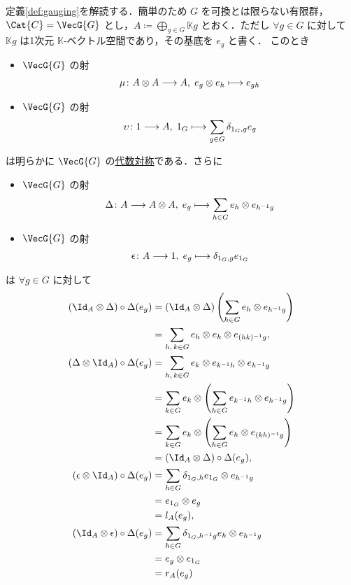 \documentclass[TQFT_main]{subfiles}
\begin{document}
定義\ref{def:gauging}を解読する．簡単のため $G$ を可換とは限らない有限群，$\Cat{C} = \VecG{G}$ とし，$A \coloneqq \bigoplus_{g \in G} \mathbb{K} g$ とおく．ただし $\forall g \in G$ に対して $\mathbb{K} g$ は1次元 $\mathbb{K}$-ベクトル空間であり，その基底を $e_g$ と書く．
このとき
\begin{itemize}
    \item $\VecG{G}$ の射
    \begin{align}
        \mu \colon A \otimes A \longrightarrow A,\; e_g \otimes e_h \longmapsto e_{gh}
    \end{align}
    \item $\VecG{G}$ の射
    \begin{align}
        \upsilon \colon 1 \longrightarrow A,\; 1_G \longmapsto \sum_{g \in G} \delta_{1_G,g} e_g
    \end{align}
\end{itemize}
は明らかに $\VecG{G}$ の\hyperref[def:algobj]{代数対称}である．さらに
\begin{itemize}
    \item $\VecG{G}$ の射
    \begin{align}
        \Delta \colon A \longrightarrow A \otimes A,\; e_g \longmapsto \sum_{h \in G} e_h \otimes e_{h^{-1}g}
    \end{align}
    \item $\VecG{G}$ の射
    \begin{align}
        \epsilon \colon A \longrightarrow 1,\; e_g \longmapsto \delta_{1_G,g} e_{1_G}
    \end{align}
\end{itemize}
は $\forall g \in G$ に対して
\begin{align}
    (\Id_A \otimes \Delta) \circ \Delta (e_g) 
    &= (\Id_A \otimes \Delta) \left(\sum_{h \in G} e_h \otimes e_{h^{-1}g}\right) \\
    &= \sum_{h,\, k \in G} e_h \otimes e_{k} \otimes e_{(hk)^{-1} g}, \\
    (\Delta \otimes \Id_A) \circ \Delta (e_g) 
    &= \sum_{h,\, k \in G} e_k \otimes e_{k^{-1} h} \otimes e_{h^{-1} g} \\
    &= \sum_{k \in G} e_k \otimes \left(\sum_{h \in G} e_{k^{-1} h} \otimes e_{h^{-1} g}\right) \\
    &= \sum_{k \in G} e_k \otimes \left(\sum_{h \in G} e_{h} \otimes e_{(kh)^{-1} g}\right) \\
    &= (\Id_A \otimes \Delta) \circ \Delta (e_g), \\
    (\epsilon \otimes \Id_A) \circ \Delta (e_g)
    &= \sum_{h \in G} \delta_{1_G,h} e_{1_G} \otimes e_{h^{-1}g} \\
    &= e_{1_G} \otimes e_g \\
    &= l_A (e_g), \\
    (\Id_A \otimes \epsilon) \circ \Delta (e_g)
    &= \sum_{h \in G} \delta_{1_G,h^{-1} g} e_{h} \otimes e_{h^{-1}g} \\
    &= e_{g} \otimes e_{1_G} \\
    &= r_A (e_g)
\end{align}
\end{document}
